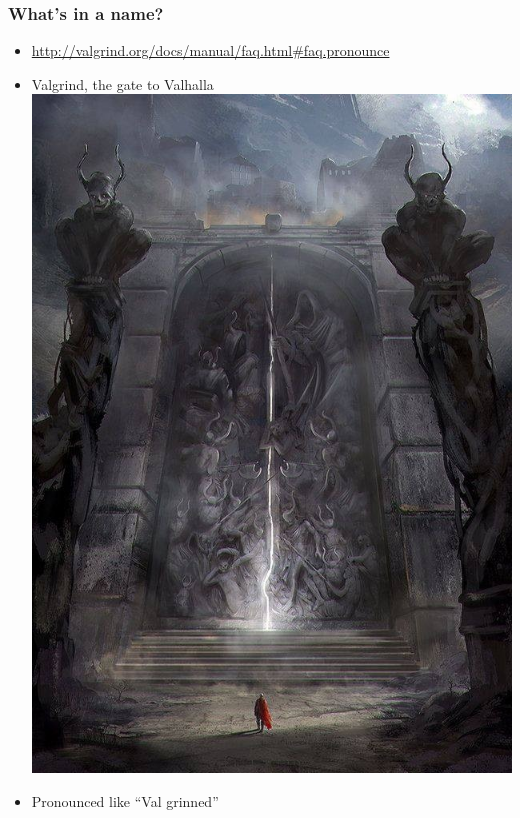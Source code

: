 \documentclass{beamer}
\begin{document}
\begin{frame}[fragile]
\frametitle{What's in a name?}
\begin{itemize}
\item \url{http://valgrind.org/docs/manual/faq.html#faq.pronounce}
\item Valgrind, the gate to Valhalla \\
\includegraphics[height=0.3\textheight]{gate.jpg}
\item Pronounced like ``Val grinned'' \\

\end{itemize}
\end{frame}
\end{document}

